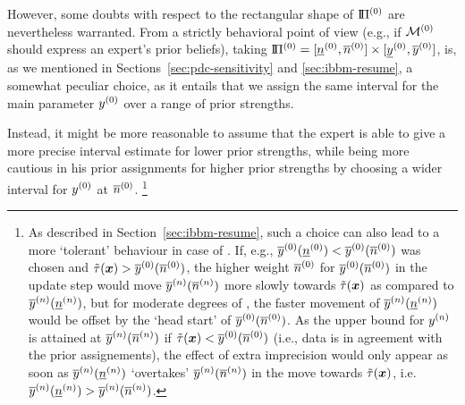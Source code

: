 However, some doubts with respect to the rectangular shape of $\text{I}\!\Pi^{(0)}$ are nevertheless warranted.
From a strictly behavioral point of view
(e.g., if $\mathcal{M}^{(0)}$ should express an expert's prior beliefs),
taking $\text{I}\!\Pi^{(0)} = [\underline{n}^{(0)}, \overline{n}^{(0)}] \times [\underline{y}^{(0)}, \overline{y}^{(0)}]$,
is, as we mentioned in Sections~\ref{sec:pdc-sensitivity} and \ref{sec:ibbm-resume}, a somewhat peculiar choice,
as it entails that we assign the same interval for the main parameter $y^{(0)}$
over a range of prior strengths.

Instead, it might be more reasonable to assume that the expert is able to give
a more precise interval estimate for lower prior strengths,
while being more cautious in his prior assignments for higher prior strengths
by choosing a wider interval for $y^{(0)}$ at $\overline{n}^{(0)}$.%
\footnote{As described in Section~\ref{sec:ibbm-resume},
such a choice can also lead to a more `tolerant' behaviour in case of \pdc.
If, e.g., $\overline{y}^{(0)}(\underline{n}^{(0)}) < \overline{y}^{(0)}(\overline{n}^{(0)})$ was chosen and $\tilde{\tau}({\bm x}) > \overline{y}^{(0)}(\overline{n}^{(0)})$,
the higher weight $\overline{n}^{(0)}$ for $\overline{y}^{(0)}(\overline{n}^{(0)})$ in the update step
would move $\overline{y}^{(n)}(\overline{n}^{(n)})$ more slowly towards $\tilde{\tau}({\bm x})$ as compared to $\overline{y}^{(n)}(\underline{n}^{(n)})$,
but for moderate degrees of \pdc, the faster movement of $\overline{y}^{(n)}(\underline{n}^{(n)})$
would be offset by the `head start' of $\overline{y}^{(0)}(\overline{n}^{(0)})$.
As the upper bound for $y^{(n)}$ is attained at $\overline{y}^{(n)}(\overline{n}^{(n)})$
if $\tilde{\tau}({\bm x}) < \overline{y}^{(0)}(\overline{n}^{(0)})$ (i.e., data is in agreement with the prior assignements),
the effect of extra imprecision would only appear as soon as
$\overline{y}^{(n)}(\underline{n}^{(n)})$ `overtakes' $\overline{y}^{(n)}(\overline{n}^{(n)})$ in the move towards $\tilde{\tau}({\bm x})$, i.e. $\overline{y}^{(n)}(\underline{n}^{(n)}) > \overline{y}^{(n)}(\overline{n}^{(n)})$.}

